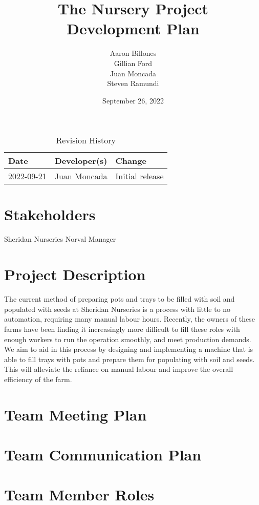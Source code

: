 \documentclass{article}
\title{The Nursery Project\\ Development Plan}
\author{Aaron Billones\\Gillian Ford\\Juan Moncada\\Steven Ramundi}
\date{September 26, 2022}
\begin{document}
\begin{table}[hp]
	\caption{Revision History} \label{TblRevisionHistory}
	\begin{tabularx}{\textwidth}{llX}
	\toprule
	\textbf{Date} & \textbf{Developer(s)} & \textbf{Change}\\
	\midrule
	2022-09-21 & Juan Moncada & Initial release\\
	\bottomrule
	\end{tabularx}
	\end{table}
	
	\newpage
	
	\maketitle
	\section{Stakeholders}
	Sheridan Nurseries Norval Manager
	
	\section{Project Description} 
	The current method of preparing pots and trays to be filled with soil and populated with seeds at Sheridan Nurseries is a process with little to no automation, requiring many manual labour hours. Recently, the owners of these farms have been finding it increasingly more difficult to fill these roles with enough workers to run the operation smoothly, and meet production demands. We aim to aid in this process by designing and implementing a machine that is able to fill trays with pots and prepare them for populating with soil and seeds. This will alleviate the reliance on manual labour and improve the overall efficiency of the farm.
	
	
	\section{Team Meeting Plan}
	
	\section{Team Communication Plan}
	
	\section{Team Member Roles}
	
\end{document}
